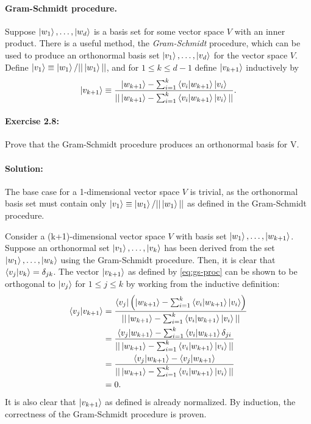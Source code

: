 \paragraph{Gram-Schmidt procedure.} Suppose $\ket{w_1}, \ldots, \ket{w_d}$ is a
basis set for some vector space $V$ with an inner product. There is a useful
method, the \emph{Gram-Schmidt} procedure, which can be used to produce an
orthonormal basis set $\ket{v_1}, \ldots, \ket{v_d}$ for the vector space $V$.
Define $\ket{v_1} \equiv \ket{w_1}/||\ket{w_1}||$, and for $1 \leq k \leq d -
1$ define $\ket{v_{k+1}}$ inductively by \begin{equation}
  \ket{v_{k+1}} \equiv \frac{\ket{w_{k+1}} - \sum_{i=1}^k \braket{v_i}{w_{k+1}}
    \ket{v_i}}{||\ket{w_{k+1}} - \sum_{i=1}^k \braket{v_i}{w_{k+1}}
    \ket{v_i}||}. \label{eq:gs-proc}
\end{equation}

\paragraph{\cite{mikeandike} Exercise 2.8:} Prove that the Gram-Schmidt
procedure produces an orthonormal basis for V.

\paragraph{Solution:} The base case for a 1-dimensional vector space $V$ is
trivial, as the orthonormal basis set must contain only $\ket{v_1} \equiv
\ket{w_1}/||\ket{w_1}||$ as defined in the Gram-Schmidt procedure.

Consider a (k+1)-dimensional vector space $V$ with basis set $\ket{w_1},
\ldots, \ket{w_{k+1}}$. Suppose an orthonormal set $\ket{v_1}, \ldots,
\ket{v_k}$ has been derived from the set $\ket{w_1}, \ldots, \ket{w_k}$ using
the Gram-Schmidt procedure. Then, it is clear that $\braket{v_j}{v_k} =
\delta_{jk}$. The vector $\ket{v_{k+1}}$ as defined by \eqref{eq:gs-proc} can
be shown to be orthogonal to $\ket{v_j}$ for $1 \leq j \leq k$ by working from
the inductive definition: \begin{align*}
  \braket{v_j}{v_{k+1}}
    &= \frac{\bra{v_j} \left(\ket{w_{k+1}} - \sum_{i=1}^k
      \braket{v_i}{w_{k+1}}\ket{v_i}\right)}{||\ket{w_{k+1}} - \sum_{i=1}^k
      \braket{v_i}{w_{k+1}}\ket{v_i}||} \\
    &= \frac{\braket{v_j}{w_{k+1}} - \sum_{i=1}^k \braket{v_i}{w_{k+1}}
      \delta_{ji}}{||\ket{w_{k+1}} - \sum_{i=1}^k \braket{v_i}{w_{k+1}}
      \ket{v_i}||} \\
    &= \frac{\braket{v_j}{w_{k+1}} - \braket{v_j}{w_{k+1}}}{||\ket{w_{k+1}} -
      \sum_{i=1}^k \braket{v_i}{w_{k+1}}\ket{v_i}||} \\
    &= 0.
\end{align*} It is also clear that $\ket{v_{k+1}}$ as defined is already
normalized. By induction, the correctness of the Gram-Schmidt procedure is
proven.


